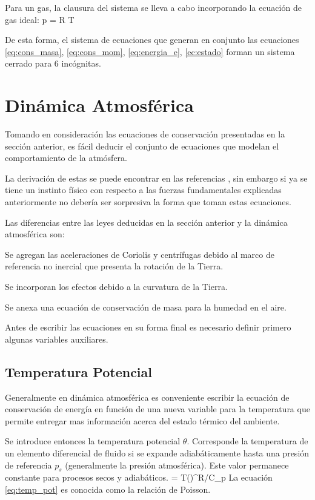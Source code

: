 Para un gas, la clausura del sistema se lleva a cabo incorporando la ecuación de gas ideal:
\be \label{eq:gas_ideal}
p = \rho R T
\ee

De esta forma, el sistema de ecuaciones que generan en conjunto las ecuaciones \ref{eq:cons_masa}, \ref{eq:cons_mom}, \ref{eq:energia_e}, \ref{ec:estado} forman un sistema cerrado para 6 incógnitas.
\newpage
\section{Dinámica Atmosférica}
Tomando en consideración las ecuaciones de conservación presentadas en la sección anterior, es fácil deducir el conjunto de ecuaciones que modelan el comportamiento de la atmósfera. 

La derivación de estas se puede encontrar en las referencias \cite{holton1992introduction}, sin embargo si ya se tiene un instinto físico con respecto a las fuerzas fundamentales explicadas anteriormente no debería ser sorpresiva la forma que toman estas ecuaciones. 

Las diferencias entre las leyes deducidas en la sección anterior y la dinámica atmosférica son:
\begin{enumerate*}
	\item Se agregan las aceleraciones de Coriolis y centrífugas debido al marco de referencia no inercial que presenta la rotación de la Tierra.
	\item Se incorporan los efectos debido a la curvatura de la Tierra.
	\item Se anexa una ecuación de conservación de masa para la humedad en el aire.
\end{enumerate*}

Antes de escribir las ecuaciones en su forma final es necesario definir primero algunas variables auxiliares.
\subsection{Temperatura Potencial}
Generalmente en dinámica atmosférica es conveniente escribir la ecuación de conservación de energía en función de una nueva variable para la temperatura que permite entregar mas información acerca del estado térmico del ambiente. 

Se introduce entonces la temperatura potencial $\theta$. Corresponde la temperatura de un elemento diferencial de fluido si se expande adiabáticamente hasta una presión de referencia $p_s$ (generalmente la presión atmosférica). Este valor permanece constante para procesos secos y adiabáticos.
\be \label{eq:temp_pot}
\theta = T\left(\right)^{R/C_p}
\ee 
La ecuación \ref{eq:temp_pot} es conocida como la relación de Poisson.
